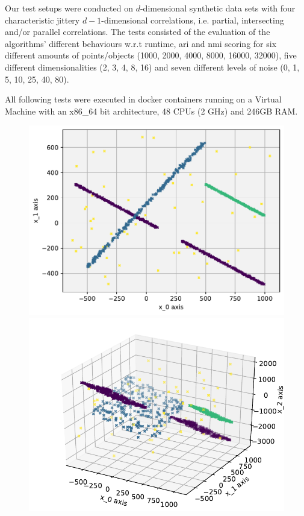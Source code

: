 Our test setups were conducted on $d$-dimensional synthetic data sets with four characteristic jittery $d-1$-dimensional correlations, i.e. partial, intersecting and/or parallel correlations. The tests consisted of the evaluation of the algorithms' different behaviours w.r.t runtime, \gls{ari} and \gls{nmi} scoring for six different amounts of points/objects (1000, 2000, 4000, 8000, 16000, 32000), five different dimensionalities (2, 3, 4, 8, 16) and seven different levels of noise (0, 1, 5, 10, 25, 40, 80).

All following tests were executed in docker containers running on a Virtual Machine with an x86\_64 bit architecture, 48 CPUs (2 GHz) and 246GB RAM. 

\begin{figure}
    \centering
    \begin{minipage}[t]{.5\textwidth}
    \centering
    \captionsetup{width=.9\linewidth}
    \includegraphics[width=\textwidth]{evalfigures/2DSetGrid.pdf}
    \end{minipage}%
    \begin{minipage}[t]{.5\textwidth}
    \centering
    \captionsetup{width=.9\linewidth}
    \includegraphics[width=\textwidth]{evalfigures/3DSet.pdf}

\end{minipage}
\end{figure}

